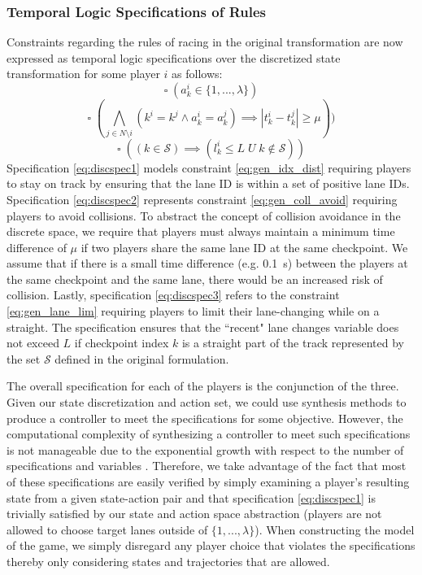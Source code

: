 \subsubsection{Temporal Logic Specifications of Rules} 
Constraints regarding the rules of racing in the original transformation are now expressed as temporal logic specifications over the discretized state transformation for some player $i$ as follows:
\begin{equation} \label{eq:discspec1}
\square \;  (a^i_k \in \{1, ..., \lambda\})
\end{equation}
\begin{equation} \label{eq:discspec2}
    \square \;  ( \bigwedge_{j \in N \setminus i} (k^i=k^j \wedge a^i_k=a^j_k) \implies |t^i_k-t^j_k| \geq \mu))
\end{equation}
\begin{equation} \label{eq:discspec3}
    \square \; ((k \in \mathcal{S})  \implies (l^i_k \leq   L \; U \; k \notin \mathcal{S}))
\end{equation}
Specification \eqref{eq:discspec1} models constraint \eqref{eq:gen_idx_dist} requiring players to stay on track by ensuring that the lane ID is within a set of positive lane IDs. Specification \eqref{eq:discspec2} represents constraint \eqref{eq:gen_coll_avoid} requiring players to avoid collisions. To abstract the concept of collision avoidance in the discrete space, we require that players must always maintain a minimum time difference of $\mu$ if two players share the same lane ID at the same checkpoint. We assume that if there is a small time difference (e.g. \SI{0.1}{\second}) between the players at the same checkpoint and the same lane, there would be an increased risk of collision. Lastly, specification \eqref{eq:discspec3} refers to the constraint \eqref{eq:gen_lane_lim} requiring players to limit their lane-changing while on a straight. The specification ensures that the ``recent" lane changes variable does not exceed $L$ if checkpoint index $k$ is a straight part of the track represented by the set $\mathcal{S}$ defined in the original formulation.

The overall specification for each of the players is the conjunction of the three. Given our state discretization and action set, we could use synthesis methods to produce a controller to meet the specifications for some objective. However, the computational complexity of synthesizing a controller to meet such specifications is not manageable due to the exponential growth with respect to the number of specifications and variables \cite{Chen2013}. Therefore, we take advantage of the fact that most of these specifications are easily verified by simply examining a player's resulting state from a given state-action pair and that specification \eqref{eq:discspec1} is trivially satisfied by our state and action space abstraction (players are not allowed to choose target lanes outside of $\{1, ..., \lambda\}$). When constructing the model of the game, we simply disregard any player choice that violates the specifications thereby only considering states and trajectories that are allowed. 
